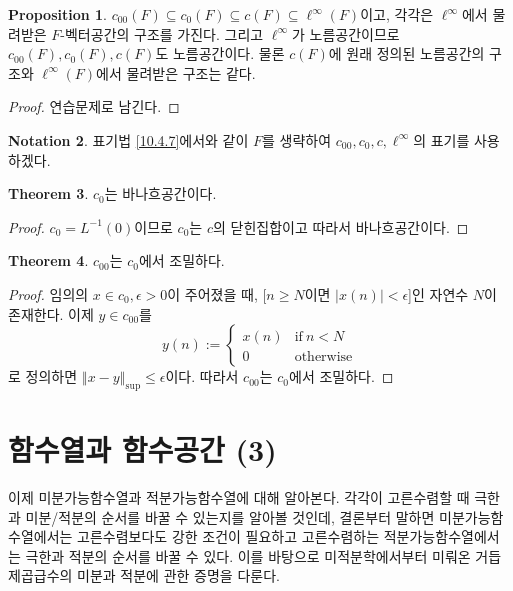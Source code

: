 \documentclass[11pt]{book}
\numberwithin{equation}{chapter}
\def\eps{\epsilon}
\newcommand{\abs}[1]{\left\vert#1\right\vert}
\newcommand{\norm}[1]{\left\Vert#1\right\Vert}
\def\textif{\text{if}}
\def\otw{\text{otherwise}}
\theoremstyle{definition}
\newtheorem{thm}{Theorem}[section]
\newtheorem{prop}[thm]{Proposition}
\newtheorem{notn}[thm]{Notation}
\begin{document}
\begin{prop} \label{prop}
    \(c_{00}(F) \subseteq c_{0}(F) \subseteq c(F) \subseteq \ell^\infty(F)\)이고, 각각은 \(\ell^\infty\)에서 물려받은 \(F\)-벡터공간의 구조를 가진다. 그리고 \(\ell^\infty\)가 노름공간이므로 \(c_{00}(F), c_0(F), c(F)\)도 노름공간이다. 물론 \(c(F)\)에 원래 정의된 노름공간의 구조와 \(\ell^\infty(F)\)에서 물려받은 구조는 같다.
\end{prop}
\begin{proof}
    연습문제로 남긴다.
\end{proof}

\begin{notn}
    표기법 \ref{10.4.7}에서와 같이 \(F\)를 생략하여 \(c_{00}, c_0, c, \ell^\infty\)의 표기를 사용하겠다.
\end{notn}

\begin{thm}
    \(c_0\)는 바나흐공간이다.
\end{thm}
\begin{proof}
    \(c_0 = L^{-1}(0)\)이므로 \(c_0\)는 \(c\)의 닫힌집합이고 따라서 바나흐공간이다.
\end{proof}

\begin{thm} \label{11.3.8}
    \(c_{00}\)는 \(c_0\)에서 조밀하다.
\end{thm}
\begin{proof}
    임의의 \(x \in c_0, \eps > 0\)이 주어졌을 때, [\(n \ge N\)이면 \(\abs{x(n)} < \eps\)]인 자연수 \(N\)이 존재한다. 이제 \(y \in c_{00}\)를
    \[
    y(n) :=
    \begin{cases}
        x(n) & \textif \ n < N\\
        0 & \otw
    \end{cases}    
    \]
    로 정의하면 \(\norm{x - y}_{\sup} \le \eps\)이다. 따라서 \(c_{00}\)는 \(c_0\)에서 조밀하다.
\end{proof}



\chapter{함수열과 함수공간 (3)}

이제 미분가능함수열과 적분가능함수열에 대해 알아본다. 각각이 고른수렴할 때 극한과 미분/적분의 순서를 바꿀 수 있는지를 알아볼 것인데, 결론부터 말하면 미분가능함수열에서는 고른수렴보다도 강한 조건이 필요하고 고른수렴하는 적분가능함수열에서는 극한과 적분의 순서를 바꿀 수 있다. 이를 바탕으로 미적분학에서부터 미뤄온 거듭제곱급수의 미분과 적분에 관한 증명을 다룬다.
\end{document}
